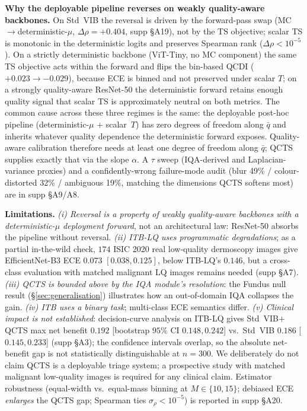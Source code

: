 \documentclass{bmvc2k}
\newcommand{\qbar}{\bar{q}}
\begin{document}
\textbf{Why the deployable pipeline reverses on weakly quality-aware backbones.}
On Std~VIB the reversal is driven by the forward-pass swap (MC$\to$deterministic-$\mu$, $\Delta\rho{=}+0.404$, supp \S A19), not by the TS objective; scalar TS is monotonic in the deterministic logits and preserves Spearman rank ($\Delta\rho{<}10^{-5}$). On a strictly deterministic backbone (ViT-Tiny, no MC component) the same TS objective acts within the forward and flips the bin-based QCDI ($+0.023\to-0.029$), because ECE is binned and not preserved under scalar $T$; on a strongly quality-aware ResNet-50 the deterministic forward retains enough quality signal that scalar TS is approximately neutral on both metrics. The common cause across these three regimes is the same: the deployable post-hoc pipeline (deterministic-$\mu$ + scalar~$T$) has zero degrees of freedom along $\qbar$ and inherits whatever quality dependence the deterministic forward exposes. Quality-aware calibration therefore needs at least one degree of freedom along $\qbar$; QCTS supplies exactly that via the slope $\alpha$. A $\tau$ sweep (IQA-derived and Laplacian-variance proxies) and a confidently-wrong failure-mode audit (blur 49\% / colour-distorted 32\% / ambiguous 19\%, matching the dimensions QCTS softens most) are in supp \S A9/A8.

\textbf{Limitations.}
\emph{(i) Reversal is a property of weakly quality-aware backbones with a deterministic-$\mu$ deployment forward}, not an architectural law: ResNet-50 absorbs the pipeline without reversal. \emph{(ii) ITB-LQ uses programmatic degradations}; as a partial in-the-wild check, $174$ ISIC 2020 real low-quality dermoscopy images give EfficientNet-B3 ECE $0.073$ $[0.038,0.125]$, below ITB-LQ's $0.146$, but a cross-class evaluation with matched malignant LQ images remains needed (supp \S A7). \emph{(iii) QCTS is bounded above by the IQA module's resolution}: the Fundus null result (\S\ref{sec:generalisation}) illustrates how an out-of-domain IQA collapses the gain. \emph{(iv) ITB uses a binary task}; multi-class ECE semantics differ. \emph{(v) Clinical impact is not established}: decision-curve analysis on ITB-LQ gives Std~VIB$+$QCTS max net benefit $0.192$ [bootstrap $95\%$ CI $0.148, 0.242$] vs.\ Std~VIB $0.186$ [$0.145, 0.233$] (supp \S A3); the confidence intervals overlap, so the absolute net-benefit gap is not statistically distinguishable at $n{=}300$. We deliberately do not claim QCTS is a deployable triage system; a prospective study with matched malignant low-quality images is required for any clinical claim. Estimator robustness (equal-width vs.\ equal-mass binning at $M\in\{10,15\}$; debiased ECE~\cite{kumar2019verified} \emph{enlarges} the QCTS gap; Spearman ties $\sigma_\rho{<}10^{-5}$) is reported in supp \S A20.
\end{document}
